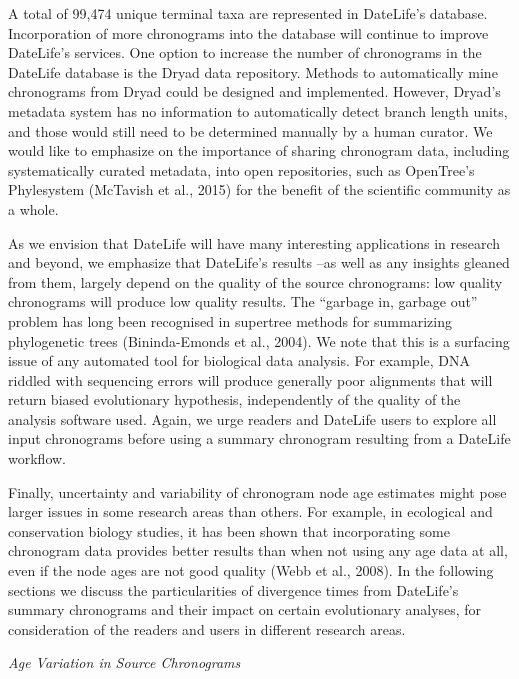 \documentclass[english,man]{apa6}
\begin{document}
A total of 99,474 unique terminal taxa are represented in DateLife's database.
Incorporation of more chronograms into the database will continue to improve DateLife's services. One option to increase the number of chronograms in the DateLife database is the Dryad data repository. Methods to automatically mine chronograms from Dryad could be designed and implemented. However, Dryad's metadata system has no information to automatically detect branch length units, and those would still need to be determined manually by a human curator.
We would like to emphasize on the importance of sharing chronogram data, including systematically curated metadata, into open repositories, such as OpenTree's Phylesystem (McTavish et al., 2015) for the benefit of the scientific community as a whole.

As we envision that DateLife will have many interesting applications in research and beyond, we emphasize that DateLife's results --as well as any insights gleaned from them, largely depend on the quality of the source chronograms: low quality chronograms will produce low quality results. The \enquote{garbage in, garbage out} problem has long been recognised in supertree methods for summarizing phylogenetic trees (Bininda-Emonds et al., 2004).
We note that this is a surfacing issue of any automated tool for biological data analysis. For example, DNA riddled with sequencing errors will produce generally poor alignments that will return biased evolutionary hypothesis, independently of the quality of the analysis software used. Again, we urge readers and DateLife users to explore all input chronograms before using a summary chronogram resulting from a DateLife workflow.

Finally, uncertainty and variability of chronogram node age estimates might pose larger issues in some research areas than others. For example, in ecological and conservation biology studies, it has been shown that incorporating some chronogram data provides better results than when not using any age data at all, even if the node ages are not good quality (Webb et al., 2008). In the following sections we discuss the particularities of divergence times from DateLife's summary chronograms and their impact on certain evolutionary analyses, for consideration of the readers and users in different research areas.

\begin{center}
\emph{Age Variation in Source Chronograms}
\end{center}
\end{document}
